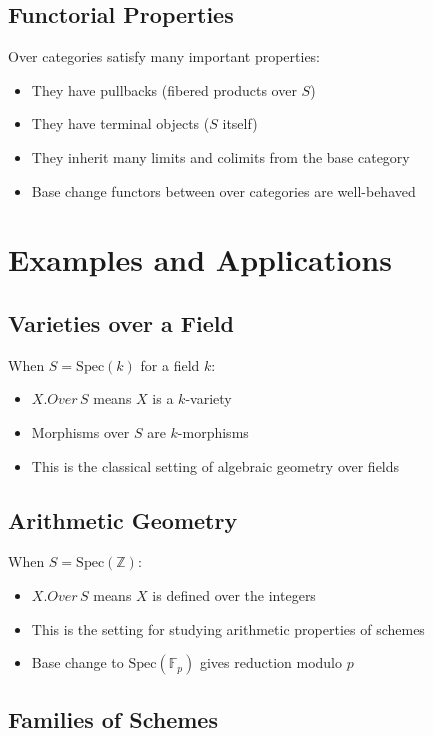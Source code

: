 \documentclass{article}
\theoremstyle{definition}
\begin{document}
\subsection{Functorial Properties}

Over categories satisfy many important properties:
\begin{itemize}
\item They have pullbacks (fibered products over $S$)
\item They have terminal objects ($S$ itself)
\item They inherit many limits and colimits from the base category
\item Base change functors between over categories are well-behaved
\end{itemize}

\section{Examples and Applications}

\subsection{Varieties over a Field}

When $S = \mathrm{Spec}(k)$ for a field $k$:
\begin{itemize}
\item $X.Over\, S$ means $X$ is a $k$-variety
\item Morphisms over $S$ are $k$-morphisms
\item This is the classical setting of algebraic geometry over fields
\end{itemize}

\subsection{Arithmetic Geometry}

When $S = \mathrm{Spec}(\mathbb{Z})$:
\begin{itemize}
\item $X.Over\, S$ means $X$ is defined over the integers
\item This is the setting for studying arithmetic properties of schemes
\item Base change to $\mathrm{Spec}(\mathbb{F}_p)$ gives reduction modulo $p$
\end{itemize}

\subsection{Families of Schemes}
\end{document}
